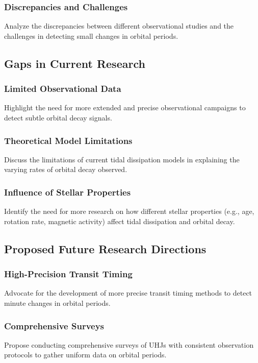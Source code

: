 \documentclass[oneside,12pt]{amsart}
\numberwithin{page}{section}
\begin{document}
\subsubsection{Discrepancies and Challenges}
Analyze the discrepancies between different observational studies and the challenges in detecting small changes in orbital periods.


\subsection{Gaps in Current Research}

\subsubsection{Limited Observational Data}
Highlight the need for more extended and precise observational campaigns to detect subtle orbital decay signals.

\subsubsection{Theoretical Model Limitations}
Discuss the limitations of current tidal dissipation models in explaining the varying rates of orbital decay observed.

\subsubsection{Influence of Stellar Properties}
Identify the need for more research on how different stellar properties (e.g., age, rotation rate, magnetic activity) affect tidal dissipation and orbital decay.


\subsection{Proposed Future Research Directions}

\subsubsection{High-Precision Transit Timing}
Advocate for the development of more precise transit timing methods to detect minute changes in orbital periods.

\subsubsection{Comprehensive Surveys}
Propose conducting comprehensive surveys of UHJs with consistent observation protocols to gather uniform data on orbital periods.
\end{document}
